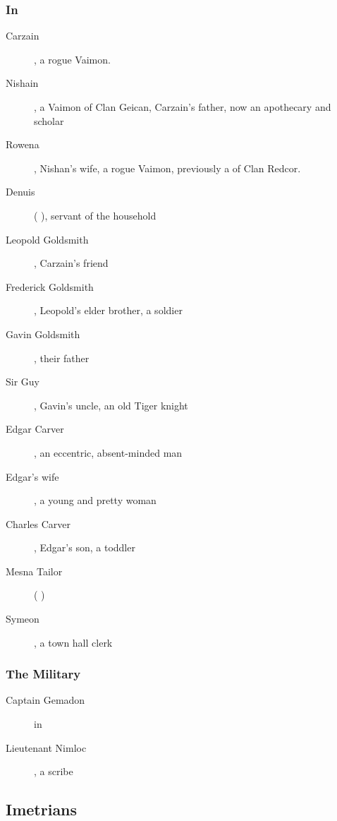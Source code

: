 \subsubsection{In \Redglen}
\begin{description}
	\item[Carzain \Deracille{} \Shireyo], a rogue Vaimon. 
	\item[Nishain \Shireyo], a Vaimon of Clan Geican, Carzain's father, now an apothecary and scholar
	\item[Rowena \Deracille], Nishan's wife, a rogue Vaimon, previously a \soror{} of Clan Redcor. 
	\item[Denuis] (\scatha{} \Venus), servant of the \Shireyo{} household
	\item[Leopold Goldsmith], Carzain's friend
	\item[Frederick Goldsmith], Leopold's elder brother, a soldier
	\item[Gavin Goldsmith], their father
	\item[Sir Guy], Gavin's uncle, an old Tiger knight
	\item[Edgar Carver], an eccentric, absent-minded man
	\item[Edgar's wife], a young and pretty woman
	\item[Charles Carver], Edgar's son, a toddler
	\item[Mesna Tailor] (\scatha{} \Venus)
	\item[Symeon], a town hall clerk
\end{description}
\subsubsection{The Military}
\begin{description}
	\item[Captain Gemadon] in \Redglen{}
	\item[Lieutenant Nimloc], a scribe
\end{description}



\subsection{Imetrians}
